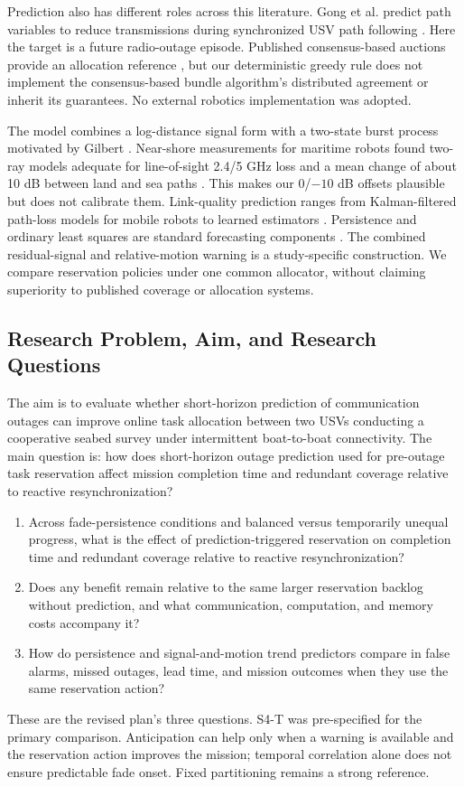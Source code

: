 Prediction also has different roles across this literature. Gong et al. predict path variables to reduce transmissions during synchronized USV path following \cite{gong2022resource}. Here the target is a future radio-outage episode. Published consensus-based auctions provide an allocation reference \cite{choi2009auction}, but our deterministic greedy rule does not implement the consensus-based bundle algorithm's distributed agreement or inherit its guarantees. No external robotics implementation was adopted.

The model combines a log-distance signal form \cite{goldsmith2005pathloss} with a two-state burst process motivated by Gilbert \cite{gilbert1960burst}. Near-shore measurements for maritime robots found two-ray models adequate for line-of-sight 2.4/5 GHz loss and a mean change of about 10 dB between land and sea paths \cite{yamamoto2019rssi}. This makes our 0/$-10$ dB offsets plausible but does not calibrate them. Link-quality prediction ranges from Kalman-filtered path-loss models for mobile robots \cite{parasuraman2023rapid} to learned estimators \cite{cerar2021lqe,kanto2024lstm}. Persistence and ordinary least squares are standard forecasting components \cite{hyndman2021forecasting,nistLeastSquares}. The combined residual-signal and relative-motion warning is a study-specific construction. We compare reservation policies under one common allocator, without claiming superiority to published coverage or allocation systems.

\subsection{Research Problem, Aim, and Research Questions}
The aim is to evaluate whether short-horizon prediction of communication outages can improve online task allocation between two USVs conducting a cooperative seabed survey under intermittent boat-to-boat connectivity. The main question is: how does short-horizon outage prediction used for pre-outage task reservation affect mission completion time and redundant coverage relative to reactive resynchronization?
\begin{enumerate}[label=\textbf{RQ\arabic*.}]
\item Across fade-persistence conditions and balanced versus temporarily unequal progress, what is the effect of prediction-triggered reservation on completion time and redundant coverage relative to reactive resynchronization?
\item Does any benefit remain relative to the same larger reservation backlog without prediction, and what communication, computation, and memory costs accompany it?
\item How do persistence and signal-and-motion trend predictors compare in false alarms, missed outages, lead time, and mission outcomes when they use the same reservation action?
\end{enumerate}
These are the revised plan's three questions. S4-T was pre-specified for the primary comparison. Anticipation can help only when a warning is available and the reservation action improves the mission; temporal correlation alone does not ensure predictable fade onset. Fixed partitioning remains a strong reference.
